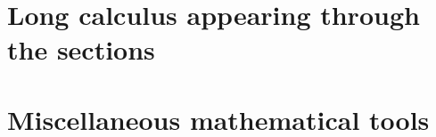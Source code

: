 \documentclass[12pt, letterpaper, twoside]{article}
\numberwithin{equation}{section}
\numberwithin{figure}{section}
\numberwithin{table}{section}
\begin{document}


\appendix

\section{Long calculus appearing through the sections}


\section{Miscellaneous mathematical tools}





\end{document}
